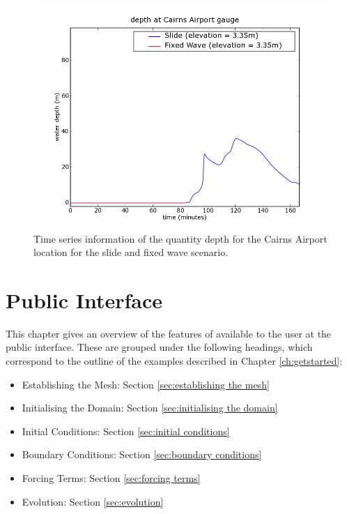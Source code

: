 \documentclass{manual}
\begin{document}
\begin{figure}[htp]
  \centerline{\includegraphics[scale=0.5]{graphics/gaugeCairnsAirportdepth.png}}
  \caption{Time series information of the quantity depth for the Cairns Airport
           location for the slide and fixed wave scenario.}
  \label{fig:airportboth}
\end{figure}


\chapter{\anuga Public Interface}
\label{ch:interface}

This chapter gives an overview of the features of \anuga available
to the user at the public interface. These are grouped under the
following headings, which correspond to the outline of the examples
described in Chapter \ref{ch:getstarted}:
\begin{itemize}
    \item Establishing the Mesh: Section \ref{sec:establishing the mesh}
    \item Initialising the Domain: Section \ref{sec:initialising the domain}
    \item Initial Conditions: Section \ref{sec:initial conditions}
    \item Boundary Conditions: Section \ref{sec:boundary conditions}
    \item Forcing Terms: Section \ref{sec:forcing terms}
    \item Evolution: Section \ref{sec:evolution}
\end{itemize}
\end{document}
